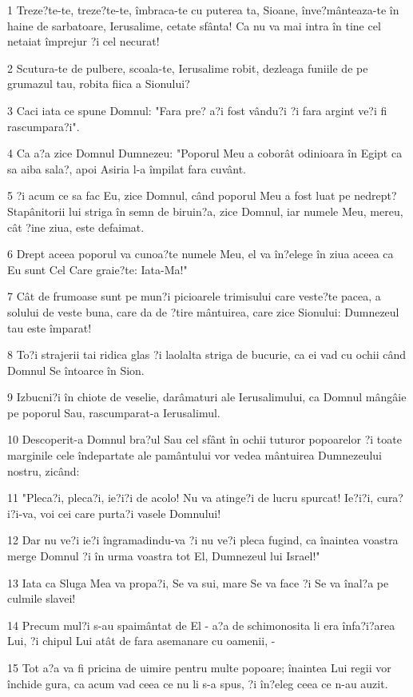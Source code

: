 \par 1 Treze?te-te, treze?te-te, îmbraca-te cu puterea ta, Sioane, înve?mânteaza-te în haine de sarbatoare, Ierusalime, cetate sfânta! Ca nu va mai intra în tine cel netaiat împrejur ?i cel necurat!
\par 2 Scutura-te de pulbere, scoala-te, Ierusalime robit, dezleaga funiile de pe grumazul tau, robita fiica a Sionului?
\par 3 Caci iata ce spune Domnul: "Fara pre? a?i fost vându?i ?i fara argint ve?i fi rascumpara?i".
\par 4 Ca a?a zice Domnul Dumnezeu: "Poporul Meu a coborât odinioara în Egipt ca sa aiba sala?, apoi Asiria l-a împilat fara cuvânt.
\par 5 ?i acum ce sa fac Eu, zice Domnul, când poporul Meu a fost luat pe nedrept? Stapânitorii lui striga în semn de biruin?a, zice Domnul, iar numele Meu, mereu, cât ?ine ziua, este defaimat.
\par 6 Drept aceea poporul va cunoa?te numele Meu, el va în?elege în ziua aceea ca Eu sunt Cel Care graie?te: Iata-Ma!"
\par 7 Cât de frumoase sunt pe mun?i picioarele trimisului care veste?te pacea, a solului de veste buna, care da de ?tire mântuirea, care zice Sionului: Dumnezeul tau este împarat!
\par 8 To?i strajerii tai ridica glas ?i laolalta striga de bucurie, ca ei vad cu ochii când Domnul Se întoarce în Sion.
\par 9 Izbucni?i în chiote de veselie, darâmaturi ale Ierusalimului, ca Domnul mângâie pe poporul Sau, rascumparat-a Ierusalimul.
\par 10 Descoperit-a Domnul bra?ul Sau cel sfânt în ochii tuturor popoarelor ?i toate marginile cele îndepartate ale pamântului vor vedea mântuirea Dumnezeului nostru, zicând:
\par 11 "Pleca?i, pleca?i, ie?i?i de acolo! Nu va atinge?i de lucru spurcat! Ie?i?i, cura?i?i-va, voi cei care purta?i vasele Domnului!
\par 12 Dar nu ve?i ie?i îngramadindu-va ?i nu ve?i pleca fugind, ca înaintea voastra merge Domnul ?i în urma voastra tot El, Dumnezeul lui Israel!"
\par 13 Iata ca Sluga Mea va propa?i, Se va sui, mare Se va face ?i Se va înal?a pe culmile slavei!
\par 14 Precum mul?i s-au spaimântat de El - a?a de schimonosita li era înfa?i?area Lui, ?i chipul Lui atât de fara asemanare cu oamenii, -
\par 15 Tot a?a va fi pricina de uimire pentru multe popoare; înaintea Lui regii vor închide gura, ca acum vad ceea ce nu li s-a spus, ?i în?eleg ceea ce n-au auzit.

